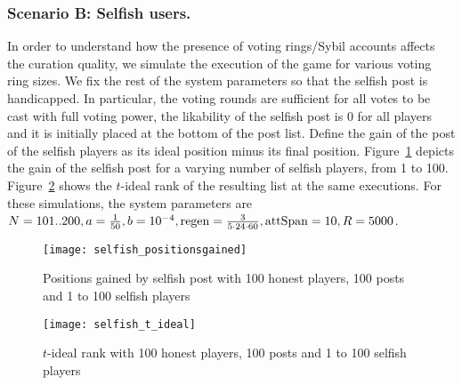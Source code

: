     \subsubsection{Scenario B: Selfish users.}
      In order to understand how the presence of voting rings/Sybil accounts
      affects the curation quality, we simulate the execution of the game for
      various voting ring sizes. We fix the rest of the system parameters so
      that the selfish post is handicapped. In particular, the voting rounds are
      sufficient for all votes to be cast with full voting power, the likability
      of the selfish post is 0 for all players and it is initially placed at the
      bottom of the post list. Define the gain of the post of the selfish
      players as its ideal position minus its final position.
      Figure~\ref{fig:selfish:gain} depicts the gain of the selfish post for a
      varying number of selfish players, from 1 to 100.
      Figure~\ref{fig:selfish:tideal} shows the $t$-ideal rank of the resulting
      list at the same executions. For these simulations, the system parameters
      are $N = 101 .. 200, a = \frac{1}{50}, b = 10^{-4}, \mathrm{regen} =
      \frac{3}{5 \cdot 24 \cdot 60}, \mathrm{attSpan} = 10, R = 5000$.

      \begin{figure}[!htbp]
        \texttt{[image: selfish\_positionsgained]}
        \caption{Positions gained by selfish post with 100 honest players, 100
        posts and 1 to 100 selfish players}
        \label{fig:selfish:gain}
      \end{figure}

      \begin{figure}[!htbp]
        \texttt{[image: selfish\_t\_ideal]}
        \caption{$t$-ideal rank with 100 honest players, 100 posts and 1 to 100
        selfish players}
        \label{fig:selfish:tideal}
      \end{figure}
